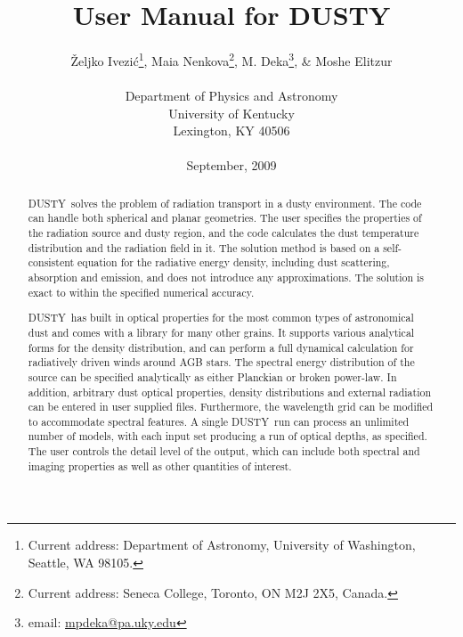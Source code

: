 \documentclass[11pt]{article}
\def\D  {{\sf DUSTY}}
\def\Ivezic {Ivezi\'c}
\begin{document}
\title{User Manual for DUSTY}

\author{\v Zeljko \Ivezic\footnote{Current address: Department of Astronomy,
  University of Washington, Seattle, WA 98105.},
  Maia Nenkova\footnote{Current address: Seneca College, Toronto, ON M2J 2X5, Canada.},
  M. Deka\footnote{email: \href{mpdeka@pa.uky.edu}{mpdeka@pa.uky.edu}},
  \& Moshe Elitzur\\
  \\Department of Physics and Astronomy\\
  University of Kentucky\\
  Lexington, KY 40506\\
  \\September, 2009
}
\date{}

\maketitle \thispagestyle{empty}

\vfil
\begin{abstract}

{\D\ solves the problem of radiation transport in a dusty environment. The code
can handle both spherical and planar geometries. The user specifies the
properties of the radiation source and dusty region, and the code calculates
the dust temperature distribution and the radiation field in it. The solution
method is based on a self-consistent equation for the radiative energy density,
including dust scattering, absorption and emission, and does not introduce any
approximations. The solution is exact to within the specified numerical
accuracy.

\D\ has built in optical properties for the most common types of astronomical
dust and comes with a library for many other grains. It supports various
analytical forms for the density distribution, and can perform a full dynamical
calculation for radiatively driven winds around AGB stars. The spectral energy
distribution of the source can be specified analytically as either Planckian or
broken power-law. In addition, arbitrary dust optical properties, density
distributions and external radiation can be entered in user supplied files.
Furthermore, the wavelength grid can be modified to accommodate spectral
features.  A single \D\ run can process an unlimited number of models, with
each input set producing a run of optical depths, as specified. The user
controls the detail level of the output, which can include both spectral and
imaging properties as well as other quantities of interest.}

\end{abstract}
\end{document}
